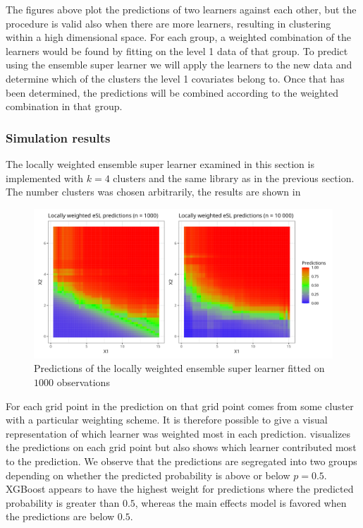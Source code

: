 \documentclass[./main.tex]{subfiles}
\begin{document}
The figures above plot the predictions of two learners against each other, but the procedure is valid also when there are more learners, resulting in clustering within a high dimensional space. For each group, a weighted combination of the learners would be found by fitting on the level 1 data of that group. To predict using the ensemble super learner we will apply the learners to the new data and determine which of the clusters the level 1 covariates belong to. Once that has been determined, the predictions will be combined according to the weighted combination in that group. 

\subsubsection{Simulation results}
The locally weighted ensemble super learner examined in this section is implemented with $ k = 4 $ clusters and the same library as in the previous section. The number clusters was chosen arbitrarily, the results are shown in 
\begin{figure}[H]
    \centering
    \includegraphics[width=\textwidth]{figures/esl_preds_lw.png}
    \caption{Predictions of the locally weighted ensemble super learner fitted on $ 1000 $ observations}
    \label{fig:esl_preds_lw}
\end{figure}
For each grid point in  the prediction on that grid point comes from some cluster with a particular weighting scheme. It is therefore possible to give a visual representation of which learner was weighted most in each prediction.  visualizes the predictions on each grid point but also shows which learner contributed most to the prediction. We observe that the predictions are segregated into two groups depending on whether the predicted probability is above or below $ p = 0.5 $. XGBoost appears to have the highest weight for predictions where the predicted probability is greater than $ 0.5 $, whereas the main effects model is favored when the predictions are below $ 0.5 $. 
\end{document}
